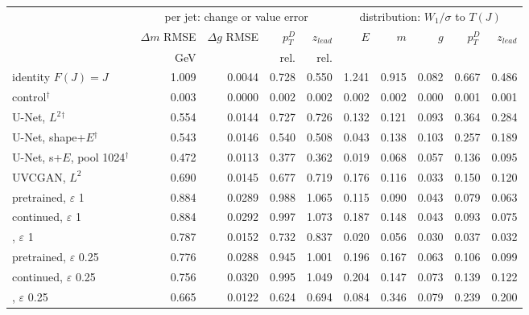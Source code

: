 \scriptsize
\begin{tabular}{lrrrrrrrrr}
\toprule
 & \multicolumn{4}{c}{per jet: change or value error} & \multicolumn{5}{c}{distribution: $W_1/\sigma$ to $T(J)$} \\
 & $\Delta m$ RMSE & $\Delta g$ RMSE & $p_T^D$ & $z_{lead}$ & $E$ & $m$ & $g$ & $p_T^D$ & $z_{lead}$ \\
 & GeV & & rel. & rel. & & & & & \\
\midrule
identity $F(J) = J$ & 1.009 & 0.0044 & 0.728 & 0.550 & 1.241 & 0.915 & 0.082 & 0.667 & 0.486 \\
\pai{} control$^\dagger$ & 0.003 & 0.0000 & 0.002 & 0.002 & 0.002 & 0.002 & 0.000 & 0.001 & 0.001 \\
\ot{} U-Net, $L^2$$^\dagger$ & 0.554 & 0.0144 & 0.727 & 0.726 & 0.132 & 0.121 & 0.093 & 0.364 & 0.284 \\
\ot{} U-Net, shape+$E$$^\dagger$ & 0.543 & 0.0146 & 0.540 & 0.508 & 0.043 & 0.138 & 0.103 & 0.257 & 0.189 \\
\ot{} U-Net, s+$E$, pool 1024$^\dagger$ & 0.472 & 0.0113 & 0.377 & 0.362 & 0.019 & 0.068 & 0.057 & 0.136 & 0.095 \\
\ot{} UVCGAN, $L^2$ & 0.690 & 0.0145 & 0.677 & 0.719 & 0.176 & 0.116 & 0.033 & 0.150 & 0.120 \\
\br{} pretrained, $\varepsilon$ 1 & 0.884 & 0.0289 & 0.988 & 1.065 & 0.115 & 0.090 & 0.043 & 0.079 & 0.063 \\
\br{} continued, $\varepsilon$ 1 & 0.884 & 0.0292 & 0.997 & 1.073 & 0.187 & 0.148 & 0.043 & 0.093 & 0.075 \\
\dsbm{}, $\varepsilon$ 1 & 0.787 & 0.0152 & 0.732 & 0.837 & 0.020 & 0.056 & 0.030 & 0.037 & 0.032 \\
\br{} pretrained, $\varepsilon$ 0.25 & 0.776 & 0.0288 & 0.945 & 1.001 & 0.196 & 0.167 & 0.063 & 0.106 & 0.099 \\
\br{} continued, $\varepsilon$ 0.25 & 0.756 & 0.0320 & 0.995 & 1.049 & 0.204 & 0.147 & 0.073 & 0.139 & 0.122 \\
\dsbm{}, $\varepsilon$ 0.25 & 0.665 & 0.0122 & 0.624 & 0.694 & 0.084 & 0.346 & 0.079 & 0.239 & 0.200 \\
\bottomrule
\end{tabular}
